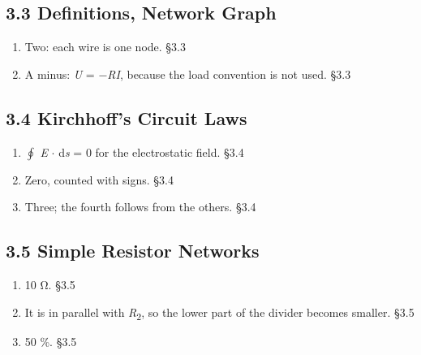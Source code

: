 \documentclass[11pt]{article}
\begin{document}
\begin{keepsection}\subsection{3.3 Definitions, Network Graph}

\begin{enumerate}
\item Two: each wire is one node. \hfill{\small\color{FAUblue}§3.3}
\item A minus: \textit{U} = \ensuremath{-}\textit{R}\textit{I}, because the load convention is not used. \hfill{\small\color{FAUblue}§3.3}
\end{enumerate}

\end{keepsection}
\begin{keepsection}\subsection{3.4 Kirchhoff’s Circuit Laws}

\begin{enumerate}
\item $\oint $ \textit{E} \ensuremath{\cdot} d\textit{s} = 0 for the electrostatic field. \hfill{\small\color{FAUblue}§3.4}
\item Zero, counted with signs. \hfill{\small\color{FAUblue}§3.4}
\item Three; the fourth follows from the others. \hfill{\small\color{FAUblue}§3.4}
\end{enumerate}

\end{keepsection}
\begin{keepsection}\subsection{3.5 Simple Resistor Networks}

\begin{enumerate}
\item 10 Ω. \hfill{\small\color{FAUblue}§3.5}
\item It is in parallel with \textit{R}\textsubscript{2}, so the lower part of the divider becomes smaller. \hfill{\small\color{FAUblue}§3.5}
\item 50 \%. \hfill{\small\color{FAUblue}§3.5}
\end{enumerate}

\end{keepsection}
\end{document}
